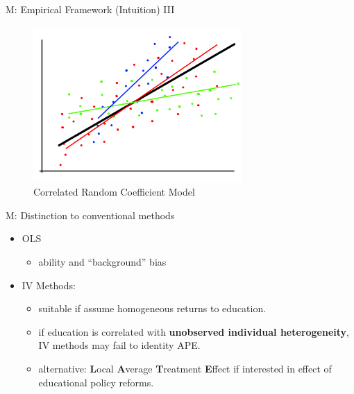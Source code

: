 \documentclass[10pt,ignorenonframetext,]{beamer}
\providecommand{\tightlist}{%
  \setlength{\itemsep}{0pt}\setlength{\parskip}{0pt}}
\begin{document}
\begin{frame}{M: Empirical Framework (Intuition) III}
\protect\hypertarget{m-empirical-framework-intuition-iii}{}

\begin{figure}
\centering
\includegraphics[width=3.125in,height=\textheight]{img/rcmodel003.png}
\caption{Correlated Random Coefficient Model}
\end{figure}

\end{frame}

\begin{frame}{M: Distinction to conventional methods}
\protect\hypertarget{m-distinction-to-conventional-methods}{}

\begin{itemize}
\item
  OLS

  \begin{itemize}
  \tightlist
  \item
    ability and ``background'' bias
  \end{itemize}
\item
  IV Methods:

  \begin{itemize}
  \tightlist
  \item
    suitable if assume homogeneous returns to education.
  \item
    if education is correlated with \textbf{unobserved individual
    heterogeneity}, IV methods may fail to identity APE.
  \item
    alternative: \textbf{L}ocal \textbf{A}verage \textbf{T}reatment
    \textbf{E}ffect if interested in effect of educational policy
    reforms.
  \end{itemize}
\end{itemize}

\end{frame}
\end{document}
